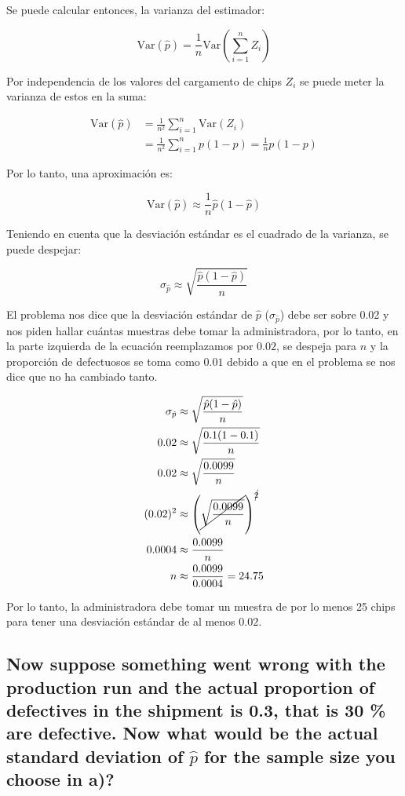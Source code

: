 \documentclass[12pt]{article}\usepackage[]{graphicx}\usepackage[]{xcolor}
\begin{document}
Se puede calcular entonces, la varianza del estimador:

\[
\mathrm{Var}(\hat{p}) = \frac{1}{n} \mathrm{Var} \left(\sum_{i=1}^{n} Z_{i} \right)
\]

Por independencia de los valores del cargamento de chips $Z_{i}$ se puede meter la varianza de estos en la suma:

\begin{align*}
  \mathrm{Var}(\hat{p}) &= \frac{1}{n^{2}} \sum_{i=1}^{n} \mathrm{Var}(Z_{i}) \\
  &= \frac{1}{n^{2}} \sum_{i=1}^{n} p(1 - p) = \frac{1}{n} p (1 -p) 
\end{align*}

Por lo tanto, una aproximación es:

\[
\mathrm{Var}(\hat{p}) \approx \frac{1}{n} \hat{p} (1 - \hat{p}) 
\]

Teniendo en cuenta que la desviación estándar es el cuadrado de la varianza, se puede despejar:

\[
\sigma_{\hat{p}} \approx \sqrt{\frac{\hat{p} (1 - \hat{p})}{n}}
\]

El problema nos dice que la desviación estándar de $\hat{p}$ ($\sigma_{\hat{p}}$) debe ser sobre 0.02 y nos piden hallar cuántas muestras debe tomar la administradora, por lo tanto, en la parte izquierda de la ecuación reemplazamos por $0.02$, se despeja para $n$ y la proporción de defectuosos se toma como $0.01$ debido a que en el problema se nos dice que no ha cambiado tanto.

\begin{align*}
  \sigma_{\hat{p}} &\approx \sqrt{\frac{\hat{p} (1 - \hat{p})}{n}} \\
  0.02 &\approx \sqrt{\frac{0.1 (1 - 0.1)}{n}  } \\
  0.02 &\approx \sqrt{\frac{0.0099}{n}  } \\
  (0.02)^{2} &\approx \left(\cancel{\sqrt{\frac{0.0099}{n}  }} \right)^{\cancel{2}}\\
  0.0004 &\approx \frac{0.0099}{n} \\
  n &\approx \frac{0.0099}{0.0004} = 24.75
\end{align*}

Por lo tanto, la administradora debe tomar un muestra de por lo menos 25 chips para tener una desviación estándar de al menos $0.02$.

\subsection{Now suppose something went wrong with the production run and the actual proportion of defectives in the shipment is 0.3, that is 30 \% are defective. Now what would be the actual standard deviation of $\hat{p}$ for the sample size you choose in a)?}
\end{document}
